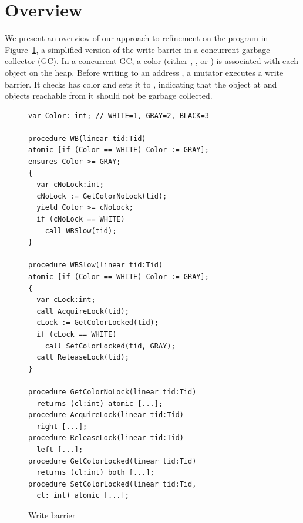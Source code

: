 \section{Overview}
\label{sec:overview}

We present an overview of our approach to refinement on the program in Figure~\ref{fig:reft},
a simplified version of the write barrier in a concurrent garbage collector (GC).
In a concurrent GC, a color (either , , or )
is associated with each object on the heap.  
Before writing to an address , a mutator executes a write
barrier. It checks 
 has color 
and sets it to , indicating that the object at 
and objects reachable from it should not be garbage collected. 

\begin{figure}
\vspace*{-1cm}
{\scriptsize
\begin{verbatim}
var Color: int; // WHITE=1, GRAY=2, BLACK=3

procedure WB(linear tid:Tid)
atomic [if (Color == WHITE) Color := GRAY];
ensures Color >= GRAY;
{
  var cNoLock:int;
  cNoLock := GetColorNoLock(tid);
  yield Color >= cNoLock;
  if (cNoLock == WHITE) 
    call WBSlow(tid);
}

procedure WBSlow(linear tid:Tid)
atomic [if (Color == WHITE) Color := GRAY];
{
  var cLock:int;
  call AcquireLock(tid);
  cLock := GetColorLocked(tid);
  if (cLock == WHITE) 
    call SetColorLocked(tid, GRAY);
  call ReleaseLock(tid);
}

procedure GetColorNoLock(linear tid:Tid) 
  returns (cl:int) atomic [...];
procedure AcquireLock(linear tid:Tid) 
  right [...];
procedure ReleaseLock(linear tid:Tid) 
  left [...];
procedure GetColorLocked(linear tid:Tid) 
  returns (cl:int) both [...];
procedure SetColorLocked(linear tid:Tid, 
  cl: int) atomic [...];
\end{verbatim}
}
\vspace*{-0.3cm}
\caption{Write barrier}
\label{fig:reft}
\end{figure}

